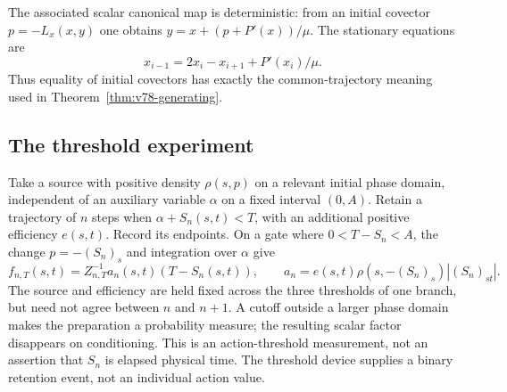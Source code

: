 The associated scalar canonical map is deterministic: from an initial
covector $p=-L_x(x,y)$ one obtains
$y=x+(p+P'(x))/\mu$.  The stationary equations are
\begin{equation}\label{eq:v78-backwards}
 x_{i-1}=2x_i-x_{i+1}+P'(x_i)/\mu.
\end{equation}
Thus equality of initial covectors has exactly the common-trajectory
meaning used in Theorem~\ref{thm:v78-generating}.

\subsection{The threshold experiment}
Take a source with positive density $\rho(s,p)$ on a relevant initial
phase domain, independent of an auxiliary variable $\alpha$ on a fixed
interval $(0,A)$.  Retain a trajectory of $n$ steps when
$\alpha+S_n(s,t)<T$, with an additional positive efficiency $e(s,t)$.
Record its endpoints.  On a gate where $0<T-S_n<A$, the change
$p=-(S_n)_s$ and integration over $\alpha$ give
\[
 f_{n,T}(s,t)=Z_{n,T}^{-1}a_n(s,t)(T-S_n(s,t)),\qquad
 a_n=e(s,t)\rho(s,-(S_n)_s)|(S_n)_{st}|.
\]
The source and efficiency are held fixed across the three thresholds of
one branch, but need not agree between $n$ and $n+1$.  A cutoff outside
a larger phase domain makes the preparation a probability measure;
the resulting scalar factor disappears on conditioning.  This is an
action-threshold measurement, not an assertion that $S_n$ is elapsed
physical time.  The threshold device supplies a binary retention event,
not an individual action value.


